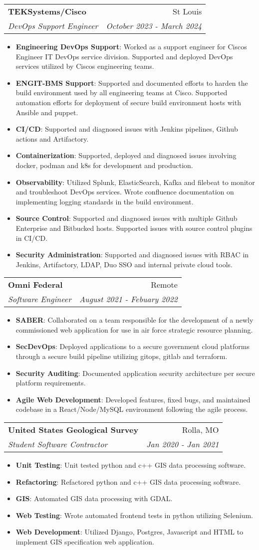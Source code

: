 \documentclass[letterpaper,11pt]{article}
\makeatletter
\newcommand{\resumeItem}[2]{
  \item\small{
    \textbf{#1}{: #2 \vspace{-2pt}}
  }
}
\newcommand{\resumeSubheading}[4]{
  \vspace{-1pt}\item
    \begin{tabular*}{0.97\textwidth}[t]{l@{\extracolsep{\fill}}r}
      \textbf{#1} & #2 \\
      \textit{\small#3} & \textit{\small #4} \\
    \end{tabular*}\vspace{-5pt}
}
\newcommand{\resumeItemListStart}{\begin{itemize}}
\newcommand{\resumeItemListEnd}{\end{itemize}\vspace{-5pt}}
\makeatother
\begin{document}
    \resumeSubheading
      {TEKSystems/Cisco}{St Louis}
      {DevOps Support Engineer}{October 2023 - March 2024}
      \resumeItemListStart
        \resumeItem{Engineering DevOps Support}{Worked as a support engineer for Ciscos Engineer IT DevOps service division.
        Supported and deployed DevOps services utilized by Ciscos engineering teams.}
        \resumeItem{ENGIT-BMS Support}{Supported and documented efforts to harden the build environment used by all
        engineering teams at Cisco. Supported automation efforts for deployment of secure build environment hosts with
        Ansible and puppet.}
        \resumeItem{CI/CD}{Supported and diagnosed issues with Jenkins pipelines, Github actions and Artifactory.}
        \resumeItem{Containerization}{Supported, deployed and diagnosed issues involving docker, podman and k8s for
        development and production.}
        \resumeItem{Observability}{Utilized Splunk, ElasticSearch, Kafka and filebeat to monitor and troubleshoot
        DevOps services. Wrote confluence documentation on implementing logging standards in the build environment.}
        \resumeItem{Source Control}{Supported and diagnosed issues with multiple Github Enterprise and Bitbucked hosts.
        Supported issues with source control plugins in CI/CD.}
        \resumeItem{Security Administration}{Supported and diagnosed issues with RBAC in Jenkins, Artifactory, LDAP, Duo SSO and
        internal private cloud tools.}
    \resumeItemListEnd
    \resumeSubheading
      {Omni Federal}{Remote}
      {Software Engineer}{August 2021 - Febuary 2022}
      \resumeItemListStart
        \resumeItem{SABER}{Collaborated on a team responsible for the development of a newly commissioned web application for use in air force strategic resource planning.}
        \resumeItem{SecDevOps}{Deployed applications to a secure government cloud platforms through a secure build pipeline utilizing gitops, gitlab and terraform.}
        \resumeItem{Security Auditing}{Documented application security architecture per secure platform requirements.}
        \resumeItem{Agile Web Development}{Developed features, fixed bugs, and maintained codebase in a React/Node/MySQL environment following the agile process.}
      \resumeItemListEnd

    \resumeSubheading
      {United States Geological Survey}{Rolla, MO}
      {Student Software Contractor}{Jan 2020 - Jan 2021}
      \resumeItemListStart
        \resumeItem{Unit Testing}{Unit tested python and c++ GIS data processing software.}
        \resumeItem{Refactoring}{Refactored python and c++ GIS data processing software.}
        \resumeItem{GIS}{Automated GIS data processing with GDAL.}
        \resumeItem{Web Testing}{Wrote automated frontend tests in python utilizing Selenium.}
        \resumeItem{Web Development}{Utilized Django, Postgres, Javascript and HTML to implement GIS specification web application.}
      \resumeItemListEnd
\end{document}
